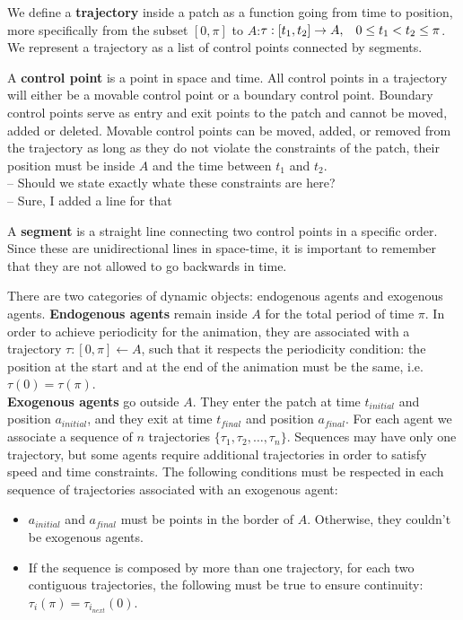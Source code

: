 \documentclass[conference]{acmsiggraph}
\newcommand\memo[1]{{\color{CornflowerBlue}#1}}
\newcommand\devin[1]{{\color{BurntOrange}#1}}
\newcommand\note[1]{{\color{Red}#1}}
\begin{document}
We define a {\bf trajectory} inside a patch as a function going from time to position, more specifically from the subset $[ 0,\pi ]$ to $A$:$ \tau:[t_1,t_2]\rightarrow A, \hspace{0.3cm} 0 \leq t_1 < t_2 \leq \pi$. We represent a trajectory as a list of control points connected by segments. 

A {\bf control point} is a point in space and time. All control points in a trajectory will either be a movable control point or a boundary control point. Boundary control points serve as entry and exit points to the patch and cannot be moved, added or deleted. Movable control points can be moved, added, or removed from the trajectory as long as they do not violate the \note{constraints of the patch, their position must be inside $A$ and the time between $t_1$ and $t_2$.} \\
\devin{-- Should we state exactly whate these constraints are here? }\\
\memo{-- Sure, I added a line for that}

A {\bf segment} is a straight line connecting two control points in a specific order. Since these are unidirectional lines in space-time, it is important to remember that they are not allowed to go backwards in time.

There are two categories of dynamic objects: endogenous agents and exogenous agents. {\bf Endogenous agents} remain inside $A$ for the total period of time $\pi$. In order to achieve periodicity for the animation, they are associated with a trajectory $\tau : [0,\pi] \leftarrow A$, such that it respects the periodicity condition: the position at the start and at the end of the animation must be the same, i.e. \mbox{$\tau (0) = \tau (\pi)$}.\\
{\bf Exogenous agents} go outside $A$. They enter the patch at time $t_{initial}$ and position $a_{initial}$, and they exit at time $t_{final}$ and position $a_{final}$. For each agent we associate a sequence of $n$ trajectories $\{ \tau_1, \tau_2, \dots, \tau_n\}$. Sequences may have only one trajectory, but some agents require additional trajectories in order to satisfy speed and time constraints. The following conditions must be respected in each sequence of trajectories associated with an exogenous agent:

\begin{itemize}

\item{$a_{initial}$ and $a_{final}$ must be points in the border of $A$. Otherwise, they couldn't be exogenous agents.}

\item{If the sequence is composed by more than one trajectory, for each two contiguous trajectories, the following must be true to ensure continuity: $\tau_i(\pi) = \tau_{i_{next}}(0)$.}

\end{itemize}
\end{document}
